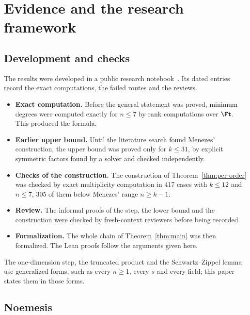 \section{Evidence and the research framework}\label{sec:framework}

\subsection{Development and checks}

The results were developed in a public research notebook~\cite{Notebook}. Its
dated entries record the exact computations, the failed routes and the reviews.
\begin{itemize}
 \item \textbf{Exact computation.} Before the general statement was proved,
 minimum degrees were computed exactly for \(n\le7\) by rank computations
 over \(\Ft\). This produced the formula.
 \item \textbf{Earlier upper bound.} Until the literature search found
 Menezes' construction, the upper bound was proved only for \(k\le31\), by
 explicit symmetric factors found by a solver and checked independently.
 \item \textbf{Checks of the construction.} The construction of
 Theorem~\ref{thm:per-order} was checked by exact multiplicity computation in
 417 cases with \(k\le12\) and \(n\le7\), 305 of them below Menezes' range
 \(n\ge k-1\).
 \item \textbf{Review.} The informal proofs of the step, the lower bound and the
 construction were checked by fresh-context reviewers before being recorded.
 \item \textbf{Formalization.} The whole chain of Theorem~\ref{thm:main} was
 then formalized. The Lean proofs follow the arguments given here.
\end{itemize}
The one-dimension step, the truncated product and the Schwartz--Zippel lemma
use generalized forms, such as every \(n\ge1\), every \(s\) and every field; this
paper states them in those forms.

\subsection{Noemesis}

